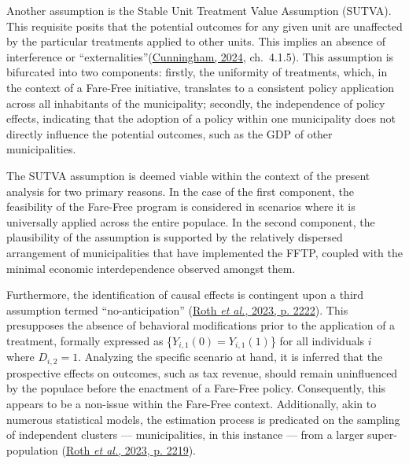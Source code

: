\documentclass[12pt, a4paper, twoside]{article}
\numberwithin{equation}{subsection} %
\begin{document}
Another assumption is the Stable Unit Treatment Value Assumption
(SUTVA). This requisite posits that the potential outcomes for any given
unit are unaffected by the particular treatments applied to other units.
This implies an absence of interference or
``externalities''(\protect\hyperlink{ref-cunningham_causal_2024}{Cunningham,
2024}, ch.~4.1.5). This assumption is bifurcated into two components:
firstly, the uniformity of treatments, which, in the context of a
Fare-Free initiative, translates to a consistent policy application
across all inhabitants of the municipality; secondly, the independence
of policy effects, indicating that the adoption of a policy within one
municipality does not directly influence the potential outcomes, such as
the GDP of other municipalities.

The SUTVA assumption is deemed viable within the context of the present
analysis for two primary reasons. In the case of the first component,
the feasibility of the Fare-Free program is considered in scenarios
where it is universally applied across the entire populace. In the
second component, the plausibility of the assumption is supported by the
relatively dispersed arrangement of municipalities that have implemented
the FFTP, coupled with the minimal economic interdependence observed
amongst them.

Furthermore, the identification of causal effects is contingent upon a
third assumption termed ``no-anticipation''
(\protect\hyperlink{ref-roth_whats_2023}{Roth \emph{et al.}, 2023, p.
2222}). This presupposes the absence of behavioral modifications prior
to the application of a treatment, formally expressed as
\{\(Y_{i,1}(0) = Y_{i,1}(1)\)\} for all individuals \(i\) where
\(D_{i,2} = 1\). Analyzing the specific scenario at hand, it is inferred
that the prospective effects on outcomes, such as tax revenue, should
remain uninfluenced by the populace before the enactment of a Fare-Free
policy. Consequently, this appears to be a non-issue within the
Fare-Free context. Additionally, akin to numerous statistical models,
the estimation process is predicated on the sampling of independent
clusters --- municipalities, in this instance --- from a larger
super-population (\protect\hyperlink{ref-roth_whats_2023}{Roth \emph{et
al.}, 2023, p. 2219}).
\end{document}
